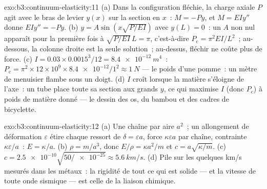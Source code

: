 \begin{solution}{exo:b3:continuum-elasticity:11}
(a) Dans la configuration fléchie, la charge axiale $P$ agit avec le
bras de levier $y(x)$ sur la section en $x$~: $M = -Py$, et
$M = EIy''$ donne $EIy'' = -Py$. (b) $y = A\sin(x\sqrt{P/EI})$ avec
$y(L) = 0$~: un $A$ non nul apparaît pour la première fois à
$\sqrt{P/EI}\,L = \pi$, c'est-à-dire $P_{\text{c}} =
\pi^2EI/L^2$~; au-dessous, la colonne droite est la seule solution~;
au-dessus, fléchir ne coûte plus de force. (c) $I = 0.03 \times 0.0015^3/12 =
\qty{8.4e-12}{m^4}$~: $P_{\text{c}} = \pi^2 \times 12\times10^9 \times
\num{8.4e-12}/1^2 \approx \qty{1}{N}$ --- le poids d'une pomme~: un
mètre de menuisier flambe sous un doigt. (d) $I$ croît lorsque la
matière s'éloigne de l'axe~: un tube place toute sa section aux grands
$y$, ce qui maximise $I$ (donc $P_{\text{c}}$) à poids de matière
donné --- le dessin des os, du bambou et des cadres de bicyclette.
\end{solution}

\begin{solution}{exo:b3:continuum-elasticity:12}
(a) Une chaîne par aire $a^2$~; un allongement de déformation
$\varepsilon$ étire chaque ressort de $\delta = \varepsilon a$, force $\kappa
\varepsilon a$ par chaîne, contrainte $\kappa\varepsilon/a$~: $E =
\kappa/a$. (b) $\rho = m/a^3$, donc $E/\rho = \kappa a^2/m$ et $c =
a\sqrt{\kappa/m}$. (c) $c = \num{2.5e-10}\sqrt{50/\num{e-25}} \approx
\qty{5.6}{km/s}$. (d) Pile sur les quelques km/s mesurés dans les
métaux~: la rigidité de tout ce qui est solide --- et la vitesse de
toute onde sismique --- est celle de la liaison chimique.
\end{solution}

